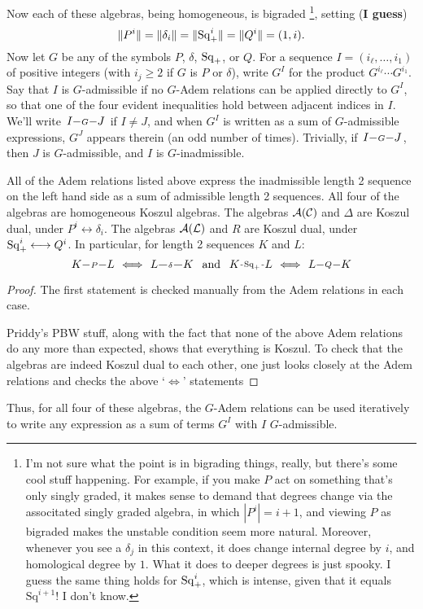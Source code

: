\documentclass[10pt]{article}
\makeatletter
\newcommand{\produces}[3]{{#1}{#3}{#2}}
\renewcommand{\Q}{Q}
\newcommand{\SqShift}{\Sq_{\smash{+}}}
\newcommand{\Sq}{\mathrm{Sq}}
\newcommand{\Comm}{\calC}
\newcommand{\LieSteen}{\calA(\calL)}
\newcommand{\CommSteen}{\calA(\Comm)}
\renewcommand{\produces}[3]{
{
\def\labelstyle{\scriptstyle}
\xymatrix@C=2em@1{
{#1}
\ar@{-}[r]|-{{\,#3\,}}
&%
{#2}%
}}}
\makeatother
\begin{document}
\begin{SteenrodAlgebrasAndTheirKoszulDuals}
Now each of these algebras, being homogeneous, is bigraded%
\footnote{I'm not sure what the point is in bigrading things, really, but there's some cool stuff happening. For example, if you make $P$ act on something that's only singly graded, it makes sense to demand that degrees change via the associtated singly graded algebra, in which $|P^i|=i+1$, and viewing $P$ as bigraded makes the unstable condition seem more natural. Moreover, whenever you see a $\delta_j$ in this context, it does change internal degree by $i$, and homological degree by $1$. What it does to deeper degrees is just spooky. I guess the same thing holds for $\SqShift^i$, which is intense, given that it equals $\Sq^{i+1}$! I don't know.}, setting (\textbf{I guess}) 
\[\|P^i\|=\|\delta_i\|=\|\SqShift^i\|=\|\Q^i\|=(1,i).\]
Now let $G$ be any of the symbols $P$, $\delta$, $\SqShift$, or $\Q$. For a sequence $I=(i_{\ell},\ldots,i_1)$ of positive integers (with $i_j\geq2$ if $G$ is $P$ or $\delta$), write $G^I$ for the product $G^{i_\ell}\cdots G^{i_1}$. Say that $I$ is $G$-admissible if no $G$-Adem relations can be applied directly to $G^I$, so that one of the four evident inequalities hold between adjacent indices in $I$. We'll write $\produces{I}{J}{G}$ if $I\neq J$, and when $G^I$ is written as a sum of $G$-admissible expressions, $G^J$ appears therein (an odd number of times). Trivially, if $\produces{I}{J}{G}$, then $J$ is $G$-admissible, and $I$ is $G$-inadmissible.
\begin{lem}
All of the Adem relations listed above express the inadmissible length 2 sequence on the left hand side as a sum of admissible length 2 sequences. All four of the algebras are homogeneous Koszul algebras. The algebras $\CommSteen$ and $\Delta$ are Koszul dual, under $P^i\longleftrightarrow\delta_i$. The algebras $\LieSteen$ and $R$ are Koszul dual, under $\SqShift^i\longleftrightarrow\Q^i$. In particular, for length 2 sequences $K$ and $L$:
\[\produces{K}{L}{P}\iff\produces{L}{K}{\delta}\textup{ \ and \ }\produces{K}{L}{\SqShift}\iff\produces{L}{K}{\Q}\]

\end{lem}
\begin{proof}
The first statement is checked manually from the Adem relations in each case.

Priddy's PBW stuff, along with the fact that none of the above Adem relations do any more than expected, shows that everything is Koszul. To check that the algebras are indeed Koszul dual to each other, one just looks closely at the Adem relations and checks the above `$\iff$' statements
\end{proof}
Thus, for all four of these algebras, the $G$-Adem relations can be used iteratively to write any expression as a sum of terms $G^I$ with $I$ $G$-admissible. 


\end{SteenrodAlgebrasAndTheirKoszulDuals}
\end{document}
